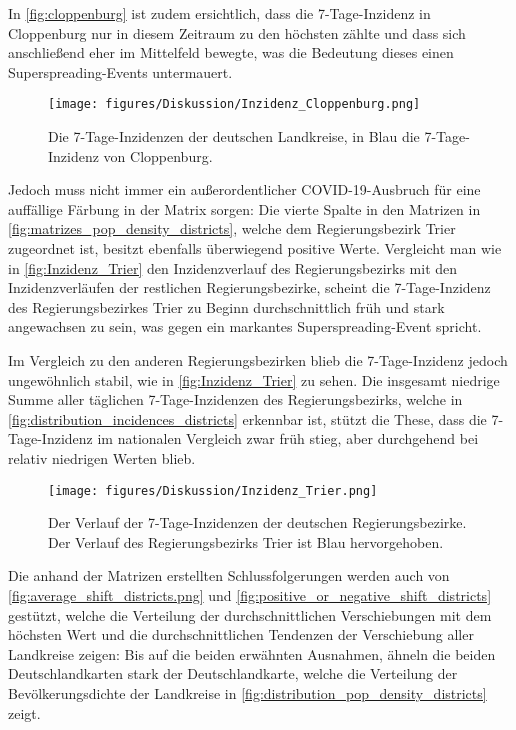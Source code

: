 In \autoref{fig:cloppenburg} ist zudem ersichtlich, dass die 7-Tage-Inzidenz in Cloppenburg nur in diesem Zeitraum zu den höchsten zählte und dass sich anschließend eher im Mittelfeld bewegte, was die Bedeutung dieses einen Superspreading-Events untermauert.
\begin{figure}[H]
    \centering
    \texttt{[image: figures/Diskussion/Inzidenz\_Cloppenburg.png]}
    \caption{Die 7-Tage-Inzidenzen der deutschen Landkreise, in Blau die 7-Tage-Inzidenz von Cloppenburg.}
    \label{fig:cloppenburg}
\end{figure}

Jedoch muss nicht immer ein außerordentlicher COVID-19-Ausbruch für eine auffällige Färbung in der Matrix sorgen: Die vierte Spalte in den Matrizen in \autoref{fig:matrizes_pop_density_districts}, welche dem Regierungsbezirk Trier zugeordnet ist, besitzt ebenfalls überwiegend positive Werte.
Vergleicht man wie in \autoref{fig:Inzidenz_Trier} den Inzidenzverlauf des Regierungsbezirks mit den Inzidenzverläufen der restlichen Regierungsbezirke, scheint die 7-Tage-Inzidenz des Regierungsbezirkes Trier zu Beginn durchschnittlich früh und stark angewachsen zu sein, was gegen ein markantes Superspreading-Event spricht.

Im Vergleich zu den anderen Regierungsbezirken blieb die 7-Tage-Inzidenz jedoch ungewöhnlich stabil, wie in \autoref{fig:Inzidenz_Trier} zu sehen. Die insgesamt niedrige Summe aller täglichen 7-Tage-Inzidenzen des Regierungsbezirks, welche in \autoref{fig:distribution_incidences_districts} erkennbar ist, stützt die These, dass die 7-Tage-Inzidenz im nationalen Vergleich zwar früh stieg, aber durchgehend bei relativ niedrigen Werten blieb.

\begin{figure}[H]
    \centering
    \texttt{[image: figures/Diskussion/Inzidenz\_Trier.png]}
    \caption{Der Verlauf der 7-Tage-Inzidenzen der deutschen Regierungsbezirke. Der Verlauf des Regierungsbezirks Trier ist Blau hervorgehoben.}
    \label{fig:Inzidenz_Trier}
\end{figure}



Die anhand der Matrizen erstellten Schlussfolgerungen werden auch von \autoref{fig:average_shift_districts.png} und \autoref{fig:positive_or_negative_shift_districts} gestützt, welche die Verteilung der durchschnittlichen Verschiebungen mit dem höchsten Wert und die durchschnittlichen Tendenzen der Verschiebung aller Landkreise zeigen: Bis auf die beiden erwähnten Ausnahmen, ähneln die beiden Deutschlandkarten stark der Deutschlandkarte, welche die Verteilung der Bevölkerungsdichte der Landkreise in \autoref{fig:distribution_pop_density_districts} zeigt.

